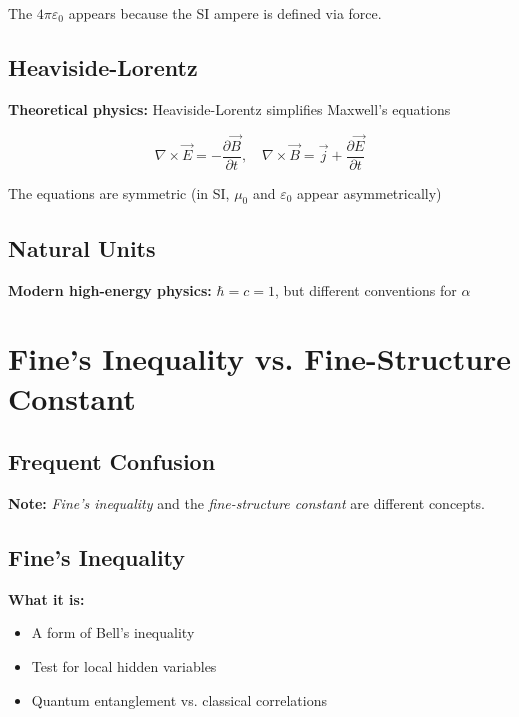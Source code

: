 	The $4\pi\varepsilon_0$ appears because the SI ampere is defined via force.
	
	\subsection{Heaviside-Lorentz}
	
	\textbf{Theoretical physics:} Heaviside-Lorentz simplifies Maxwell's equations
	
	\begin{equation}
		\nabla \times \vec{E} = -\frac{\partial \vec{B}}{\partial t}, \quad \nabla \times \vec{B} = \vec{j} + \frac{\partial \vec{E}}{\partial t}
	\end{equation}
	
	The equations are symmetric (in SI, $\mu_0$ and $\varepsilon_0$ appear asymmetrically)
	
	\subsection{Natural Units}
	
	\textbf{Modern high-energy physics:} $\hbar = c = 1$, but different conventions for $\alpha$
	
	\section{Fine's Inequality vs. Fine-Structure Constant}
	
	\subsection{Frequent Confusion}
	
	\textbf{Note:} \textit{Fine's inequality} and the \textit{fine-structure constant} are different concepts.
	
	\subsection{Fine's Inequality}
	
	\textbf{What it is:}
	\begin{itemize}
		\item A form of Bell's inequality
		\item Test for local hidden variables
		\item Quantum entanglement vs. classical correlations
	\end{itemize}
	
